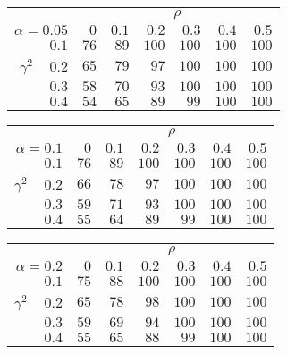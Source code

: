 \begin{tabular}{r|rrrrrr}
\hline\hline
 &\multicolumn{6}{c}{$\rho$} \\ 
 $\alpha = 0.05$ & $0$ & $0.1$ & $0.2$ & $0.3$ & $0.4$ & $0.5$ \\ 
 \hline$0.1$ & $ 76$ & $ 89$ & $100$ & $100$ & $100$ & $100$\\ 
$\gamma^2\;\;\;$ $0.2$ & $ 65$ & $ 79$ & $ 97$ & $100$ & $100$ & $100$\\ 
$0.3$ & $ 58$ & $ 70$ & $ 93$ & $100$ & $100$ & $100$\\ 
$0.4$ & $ 54$ & $ 65$ & $ 89$ & $ 99$ & $100$ & $100$\\ 
 \hline 
 \end{tabular}
 
 \vspace{2em} 
 
\begin{tabular}{r|rrrrrr}
\hline\hline
 &\multicolumn{6}{c}{$\rho$} \\ 
 $\alpha = 0.1$ & $0$ & $0.1$ & $0.2$ & $0.3$ & $0.4$ & $0.5$ \\ 
 \hline$0.1$ & $ 76$ & $ 89$ & $100$ & $100$ & $100$ & $100$\\ 
$\gamma^2\;\;\;$ $0.2$ & $ 66$ & $ 78$ & $ 97$ & $100$ & $100$ & $100$\\ 
$0.3$ & $ 59$ & $ 71$ & $ 93$ & $100$ & $100$ & $100$\\ 
$0.4$ & $ 55$ & $ 64$ & $ 89$ & $ 99$ & $100$ & $100$\\ 
 \hline 
 \end{tabular}
 
 \vspace{2em} 
 
\begin{tabular}{r|rrrrrr}
\hline\hline
 &\multicolumn{6}{c}{$\rho$} \\ 
 $\alpha = 0.2$ & $0$ & $0.1$ & $0.2$ & $0.3$ & $0.4$ & $0.5$ \\ 
 \hline$0.1$ & $ 75$ & $ 88$ & $100$ & $100$ & $100$ & $100$\\ 
$\gamma^2\;\;\;$ $0.2$ & $ 65$ & $ 78$ & $ 98$ & $100$ & $100$ & $100$\\ 
$0.3$ & $ 59$ & $ 69$ & $ 94$ & $100$ & $100$ & $100$\\ 
$0.4$ & $ 55$ & $ 65$ & $ 88$ & $ 99$ & $100$ & $100$\\ 
 \hline 
 \end{tabular}